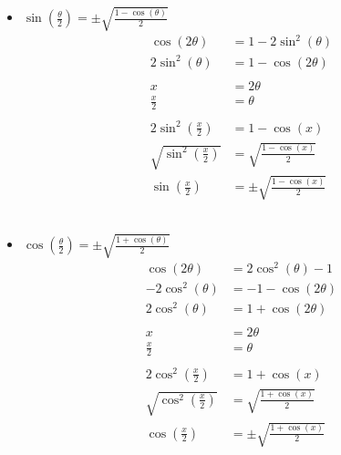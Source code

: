 \documentclass[12pt]{article}
\begin{document}
\begin{itemize}
    \item $\sin \left(\frac{\theta}{2}\right) = \pm \sqrt{\frac{1 - \cos(\theta)}{2}}$
        \begin{align*} 
            \cos (2 \theta) &= 1 - 2\sin^2(\theta) \\
            2\sin^2(\theta) &= 1 - \cos(2 \theta) \\ \\
            x &= 2 \theta  \\
            \frac{x}{2} &= \theta \\ \\
            2 \sin^2 \left(\frac{x}{2}\right) &= 1 - \cos(x) \\
            \sqrt{\sin^2 \left(\frac{x}{2}\right)} &= \sqrt{\frac{1 - \cos(x)}{2}} \\
            \sin \left(\frac{x}{2}\right) &= \pm \sqrt{\frac{1 - \cos(x)}{2}} \tag*{$\square$}
        \end{align*}
            \\

    \item $\cos(\frac{\theta}{2}) = \pm \sqrt{\frac{1 + \cos(\theta)}{2}}$
        \begin{align*}
            \cos (2 \theta) &= 2\cos^2(\theta) - 1 \\
            - 2\cos^2(\theta) &= -1 - \cos(2 \theta) \\
            2\cos^2(\theta) &= 1 + \cos(2 \theta) \\ \\
            x &= 2 \theta  \\
            \frac{x}{2} &= \theta \\ \\
            2\cos^2 \left(\frac{x}{2}\right) &= 1 + \cos(x) \\
            \sqrt{\cos^2 \left(\frac{x}{2}\right)} &= \sqrt{\frac{1 + \cos(x)}{2}} \\
            \cos \left(\frac{x}{2}\right) &= \pm \sqrt{\frac{1 + \cos(x)}{2}} \tag*{$\square$}
        \end{align*}
            \\


\end{itemize}
\end{document}

